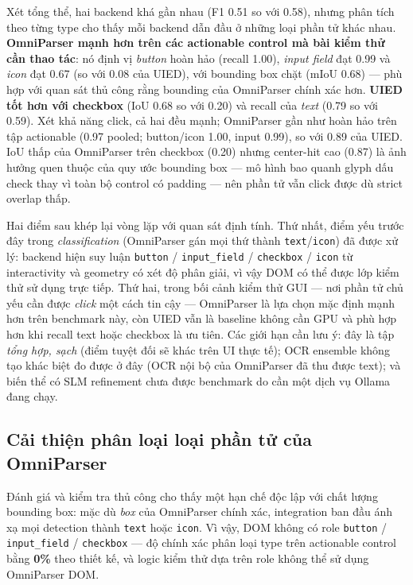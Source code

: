 \documentclass[11pt,a4paper]{article}
\newcommand{\code}[1]{\texttt{#1}}
\begin{document}
Xét tổng thể, hai backend khá gần nhau (F1 0.51 so với 0.58), nhưng phân tích theo
từng type cho thấy mỗi backend dẫn đầu ở những loại phần tử khác nhau.
\textbf{OmniParser mạnh hơn trên các actionable control mà bài kiểm thử cần thao
tác}: nó định vị \emph{button} hoàn hảo (recall 1.00), \emph{input field} đạt 0.99
và \emph{icon} đạt 0.67 (so với 0.08 của UIED), với bounding box chặt (mIoU 0.68)
--- phù hợp với quan sát thủ công rằng bounding của OmniParser chính xác hơn.
\textbf{UIED tốt hơn với checkbox} (IoU 0.68 so với 0.20) và recall của \emph{text}
(0.79 so với 0.59). Xét khả năng click, cả hai đều mạnh; OmniParser gần như hoàn hảo
trên tập actionable (0.97 pooled; button/icon 1.00, input 0.99), so với 0.89 của
UIED. IoU thấp của OmniParser trên checkbox (0.20) nhưng center-hit cao (0.87) là
ảnh hưởng quen thuộc của quy ước bounding box --- mô hình bao quanh glyph dấu check
thay vì toàn bộ control có padding --- nên phần tử vẫn click được dù strict overlap
thấp.

Hai điểm sau khép lại vòng lặp với quan sát định tính. Thứ nhất, điểm yếu trước đây
trong \emph{classification} (OmniParser gán mọi thứ thành \code{text}/\code{icon})
đã được xử lý: backend hiện suy luận \code{button} / \code{input\_field} /
\code{checkbox} / \code{icon} từ interactivity và geometry có xét độ phân giải, vì
vậy DOM có thể được lớp kiểm thử sử dụng trực tiếp. Thứ hai, trong bối cảnh kiểm thử
GUI --- nơi phần tử chủ yếu cần được \emph{click} một cách tin cậy --- OmniParser là
lựa chọn mặc định mạnh hơn trên benchmark này, còn UIED vẫn là baseline không cần
GPU và phù hợp hơn khi recall text hoặc checkbox là ưu tiên. Các giới hạn cần lưu ý:
đây là tập \emph{tổng hợp, sạch} (điểm tuyệt đối sẽ khác trên UI thực tế); OCR
ensemble không tạo khác biệt đo được ở đây (OCR nội bộ của OmniParser đã thu được
text); và biến thể có SLM refinement chưa được benchmark do cần một dịch vụ Ollama
đang chạy.

\subsection{Cải thiện phân loại loại phần tử của OmniParser}
Đánh giá và kiểm tra thủ công cho thấy một hạn chế độc lập với chất lượng bounding
box: mặc dù \emph{box} của OmniParser chính xác, integration ban đầu ánh xạ mọi
detection thành \code{text} hoặc \code{icon}. Vì vậy, DOM không có role
\code{button} / \code{input\_field} / \code{checkbox} --- độ chính xác phân loại
type trên actionable control bằng \textbf{0\%} theo thiết kế, và logic kiểm thử dựa
trên role không thể sử dụng OmniParser DOM.
\end{document}
